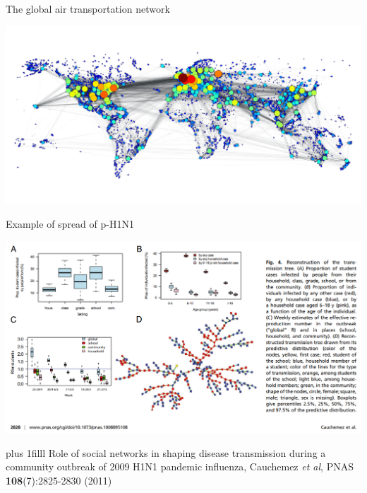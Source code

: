 \documentclass[aspectratio=43]{beamer}
\begin{document}
\begin{frame}{The global air transportation network}
	\bigskip\bigskip\bigskip
	\bigskip
	\begin{center}
	\hspace*{-\beamerleftmargin}
	\includegraphics[width=\paperwidth]{FIGS_slides/world_graph-degree}
	\end{center}
\end{frame}

\begin{frame}{Example of spread of p-H1N1}
	\bigskip\bigskip\bigskip
	\bigskip
	\begin{center}
	\hspace*{-\beamerleftmargin}
	\includegraphics[width=\paperwidth]{FIGS_slides/Cauchemez_etal_H1N1}
	\end{center}
	\vskip0pt plus 1filll
	\tiny
	Role of social networks in shaping disease transmission during a community outbreak of 2009 H1N1 pandemic influenza, Cauchemez \emph{et al}, PNAS \textbf{108}(7):2825-2830 (2011)
\end{frame}
	
\end{document}
